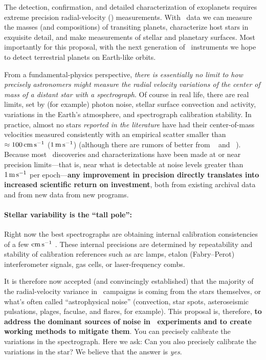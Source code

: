 \documentclass[12pt, letterpaper]{article}
\begin{document}
\sloppy\sloppypar\raggedbottom\frenchspacing

\noindent
The detection, confirmation, and detailed characterization of exoplanets
requires extreme precision radial-velocity (\EPRV)
measurements.
With \EPRV\ data we can measure the 
masses (and compositions) of transiting planets,
characterize host stars in exquisite detail,
and make measurements of stellar and planetary surfaces.
Most importantly for this proposal, with the next generation of \EPRV\ 
instruments we hope to detect terrestrial planets on Earth-like orbits.

From a fundamental-physics perspective, \emph{there is essentially no limit to how
precisely astronomers might measure the radial velocity variations
of the center of mass of a distant star with a spectrograph}.
Of course in real life, there are real limits, set
by (for example) photon noise, stellar surface convection and activity,
variations in the Earth's atmosphere, and spectrograph calibration stability.
In practice, almost no stars \emph{reported in the literature}
have had their center-of-mass
velocities measured consistently with an empirical scatter
smaller than $\approx 100\,{\mathrm{cm\,s^{-1}}}$ 
($1\,{\mathrm{m\,s^{-1}}}$) (although there are rumors of better from \ESPRESSO\ \citep{Pepe2010} and \EXPRES\ \citep{Jurgenson2016}).
Because most \EPRV\ discoveries and characterizations have been made
at or near precision limits---that is, near what is detectable at noise levels
greater than $1\,{\mathrm{m\,s^{-1}}}$ per epoch---\textbf{any improvement in precision directly
translates into increased scientific return on investment},
both from existing archival data and from new data from new programs.

\paragraph{Stellar variability is the ``tall pole'':}
Right now the best spectrographs are obtaining internal calibration
consistencies of a few ${\mathrm{cm\,s^{-1}}}$ \citep{espresso-eprv4, expres-eprv4}.
These internal precisions are determined by repeatability and
stability of calibration references such as arc lamps, etalon
(Fabry--Perot) interferometer signals, gas cells, or laser-frequency
combs.

It is therefore now accepted (and convincingly
established) that the majority of the radial-velocity variance
in \EPRV\ campaigns is coming from the stars themselves, or what's
often called ``astrophysical noise'' (convection, star spots,
asteroseismic pulsations, plages, faculae, and flares, for example).
This proposal is, therefore, \textbf{to address the dominant sources of
  noise in \EPRV\ experiments and to create working methods to
  mitigate them}.
You can precisely calibrate the variations in the spectrograph.
Here we ask: Can you also precisely calibrate the variations in the star?
We believe that the answer is \emph{yes}.
\end{document}
